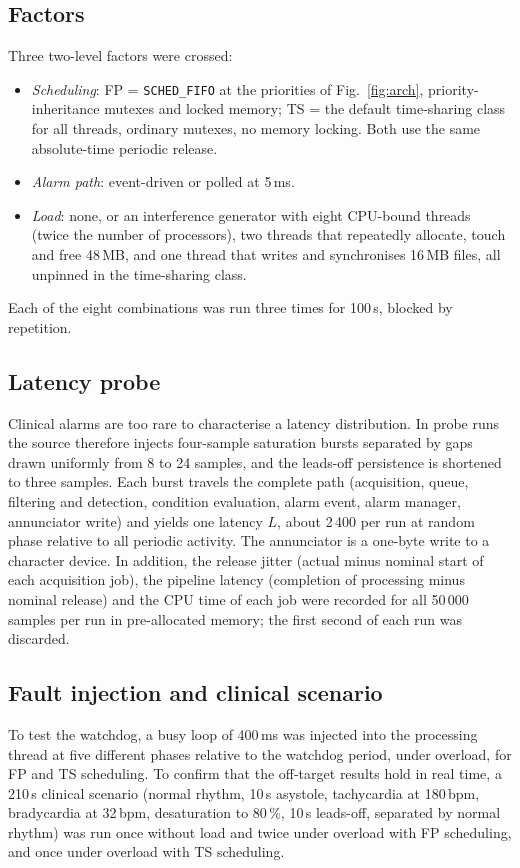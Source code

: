 \documentclass[preprint,3p,10pt]{elsarticle}
\begin{document}
\subsection{Factors}
Three two-level factors were crossed:
\begin{itemize}
\item \emph{Scheduling}: FP = \texttt{SCHED\_FIFO} at the priorities of Fig.~\ref{fig:arch}, priority-inheritance mutexes and locked memory; TS = the default time-sharing class for all threads, ordinary mutexes, no memory locking. Both use the same absolute-time periodic release.
\item \emph{Alarm path}: event-driven or polled at 5\,ms.
\item \emph{Load}: none, or an interference generator with eight CPU-bound threads (twice the number of processors), two threads that repeatedly allocate, touch and free 48\,MB, and one thread that writes and synchronises 16\,MB files, all unpinned in the time-sharing class.
\end{itemize}
Each of the eight combinations was run three times for 100\,s, blocked by repetition.

\subsection{Latency probe}
Clinical alarms are too rare to characterise a latency distribution. In probe runs the source therefore injects four-sample saturation bursts separated by gaps drawn uniformly from 8 to 24 samples, and the leads-off persistence is shortened to three samples. Each burst travels the complete path (acquisition, queue, filtering and detection, condition evaluation, alarm event, alarm manager, annunciator write) and yields one latency $L$, about 2\,400 per run at random phase relative to all periodic activity. The annunciator is a one-byte write to a character device. In addition, the release jitter (actual minus nominal start of each acquisition job), the pipeline latency (completion of processing minus nominal release) and the CPU time of each job were recorded for all 50\,000 samples per run in pre-allocated memory; the first second of each run was discarded.

\subsection{Fault injection and clinical scenario}
To test the watchdog, a busy loop of 400\,ms was injected into the processing thread at five different phases relative to the watchdog period, under overload, for FP and TS scheduling. To confirm that the off-target results hold in real time, a 210\,s clinical scenario (normal rhythm, 10\,s asystole, tachycardia at 180\,bpm, bradycardia at 32\,bpm, desaturation to 80\,\%, 10\,s leads-off, separated by normal rhythm) was run once without load and twice under overload with FP scheduling, and once under overload with TS scheduling.
\end{document}
